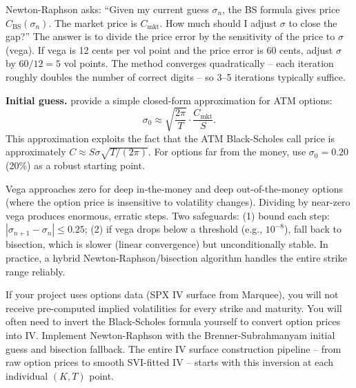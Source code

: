 \begin{intuition}
Newton-Raphson asks: ``Given my current guess $\sigma_n$, the BS formula gives price $C_{\text{BS}}(\sigma_n)$.
The market price is $C_{\text{mkt}}$.
How much should I adjust $\sigma$ to close the gap?''
The answer is to divide the price error by the sensitivity of the price to $\sigma$ (vega).
If vega is 12 cents per vol point and the price error is 60 cents, adjust $\sigma$ by $60/12 = 5$ vol points.
The method converges quadratically -- each iteration roughly doubles the number of correct digits -- so 3--5 iterations typically suffice.
\end{intuition}

\textbf{Initial guess.}
\citet{BrennerSubrahmanyam1988} provide a simple closed-form approximation for ATM options:
\begin{equation}\label{eq:bs-approx}
\sigma_0 \approx \sqrt{\frac{2\pi}{T}} \cdot \frac{C_{\text{mkt}}}{S}.
\end{equation}
This approximation exploits the fact that the ATM Black-Scholes call price is approximately $C \approx S\sigma\sqrt{T/(2\pi)}$.
For options far from the money, use $\sigma_0 = 0.20$ (20\%) as a robust starting point.

\begin{warning}
Vega approaches zero for deep in-the-money and deep out-of-the-money options (where the option price is insensitive to volatility changes).
Dividing by near-zero vega produces enormous, erratic steps.
Two safeguards:
(1) bound each step: $|\sigma_{n+1} - \sigma_n| \leq 0.25$;
(2) if vega drops below a threshold (e.g., $10^{-8}$), fall back to bisection, which is slower (linear convergence) but unconditionally stable.
In practice, a hybrid Newton-Raphson/bisection algorithm handles the entire strike range reliably.
\end{warning}

\begin{projectconnection}
If your project uses options data (SPX IV surface from Marquee), you will not receive pre-computed implied volatilities for every strike and maturity.
You will often need to invert the Black-Scholes formula yourself to convert option prices into IV.
Implement Newton-Raphson with the Brenner-Subrahmanyam initial guess and bisection fallback.
The entire IV surface construction pipeline -- from raw option prices to smooth SVI-fitted IV -- starts with this inversion at each individual $(K, T)$ point.
\end{projectconnection}

